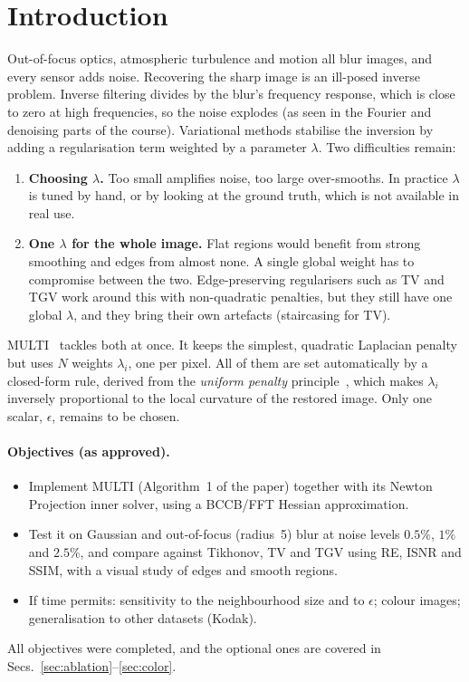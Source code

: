 \section{Introduction}
\label{sec:intro}

Out-of-focus optics, atmospheric turbulence and motion all blur images, and every
sensor adds noise. Recovering the sharp image is an ill-posed inverse problem.
Inverse filtering divides by the blur's frequency response, which is close to
zero at high frequencies, so the noise explodes (as seen in the Fourier and
denoising parts of the course). Variational methods stabilise the inversion by
adding a regularisation term weighted by a parameter $\lambda$. Two
difficulties remain:
\begin{enumerate}[leftmargin=*,itemsep=1pt]
\item \textbf{Choosing $\lambda$.} Too small amplifies noise, too large
  over-smooths. In practice $\lambda$ is tuned by hand, or by looking at
  the ground truth, which is not available in real use.
\item \textbf{One $\lambda$ for the whole image.} Flat regions would benefit from
  strong smoothing and edges from almost none. A single global weight has to
  compromise between the two. Edge-preserving regularisers such as TV and TGV
  work around this with non-quadratic penalties, but they still have one
  global $\lambda$, and they bring their own artefacts (staircasing for TV).
\end{enumerate}

MULTI~\cite{multi} tackles both at once. It keeps the simplest, quadratic
Laplacian penalty but uses $N$ weights $\lambda_i$, one per pixel. All of them
are set automatically by a closed-form rule, derived from the \emph{uniform
penalty} principle~\cite{upen}, which makes $\lambda_i$ inversely proportional
to the local curvature of the restored image. Only one scalar, $\epsilon$,
remains to be chosen.

\paragraph{Objectives (as approved).}
\begin{itemize}[leftmargin=*,itemsep=1pt]
\item Implement MULTI (Algorithm~1 of the paper) together with its Newton Projection
  inner solver, using a BCCB/FFT Hessian approximation.
\item Test it on Gaussian and out-of-focus (radius~5) blur at noise levels
  $0.5\%$, $1\%$ and $2.5\%$, and compare against Tikhonov, TV and TGV using RE,
  ISNR and SSIM, with a visual study of edges and smooth regions.
\item If time permits: sensitivity to the neighbourhood size and to $\epsilon$;
  colour images; generalisation to other datasets (Kodak).
\end{itemize}
All objectives were completed, and the optional ones are covered in
Secs.~\ref{sec:ablation}--\ref{sec:color}.


